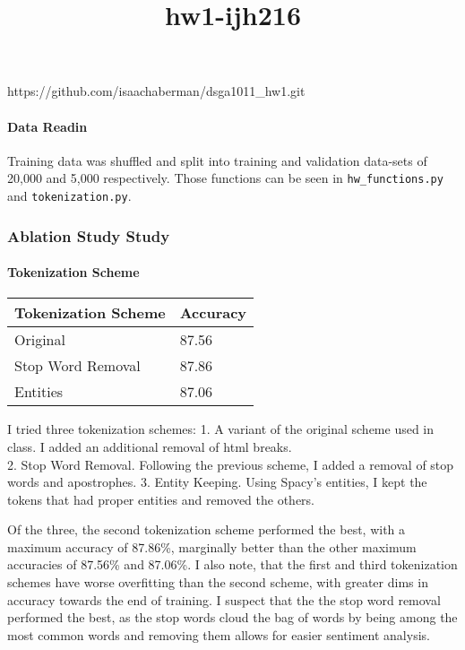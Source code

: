 \documentclass[11pt]{article}
\title{hw1-ijh216}
\begin{document}
    
    
    \maketitle
    
    

    
    https://github.com/isaachaberman/dsga1011\_hw1.git

    \paragraph{Data Readin}\label{data-readin}

Training data was shuffled and split into training and validation
data-sets of 20,000 and 5,000 respectively. Those functions can be seen
in \texttt{hw\_functions.py} and \texttt{tokenization.py}.

    \subsubsection{Ablation Study Study}\label{ablation-study-study}

\paragraph{Tokenization Scheme}\label{tokenization-scheme}

\begin{longtable}[]{@{}ll@{}}
\toprule
Tokenization Scheme & Accuracy\tabularnewline
\midrule
\endhead
Original & 87.56\tabularnewline
Stop Word Removal & 87.86\tabularnewline
Entities & 87.06\tabularnewline
\bottomrule
\end{longtable}

I tried three tokenization schemes: 1. A variant of the original scheme
used in class. I added an additional removal of html breaks.\\
2. Stop Word Removal. Following the previous scheme, I added a removal
of stop words and apostrophes. 3. Entity Keeping. Using Spacy's
entities, I kept the tokens that had proper entities and removed the
others.

Of the three, the second tokenization scheme performed the best, with a
maximum accuracy of 87.86\%, marginally better than the other maximum
accuracies of 87.56\% and 87.06\%. I also note, that the first and third
tokenization schemes have worse overfitting than the second scheme, with
greater dims in accuracy towards the end of training. I suspect that the
the stop word removal performed the best, as the stop words cloud the
bag of words by being among the most common words and removing them
allows for easier sentiment analysis.
\end{document}

